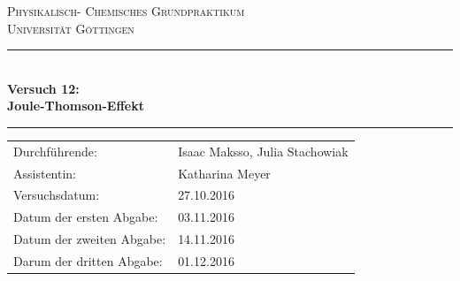 \documentclass[a4paper,12pt,oneside,onecolum,final,openany]{report}
\begin{document}
\begin{titlepage}
\centering
\textsc{\Large Physikalisch- Chemisches Grundpraktikum\\[1.5ex] Universität Göttingen}

\vspace*{0.5cm}

\rule{\textwidth}{1pt}\\[0.5cm]
{\huge \bfseries
  Versuch 12: \\[1.5ex]
  Joule-Thomson-Effekt}\\[0.5cm]
\rule{\textwidth}{1pt}

\vspace*{0.5cm}


\begin{Large}
\begin{tabular}{ll}
Durchführende: &  Isaac Maksso, Julia Stachowiak\\
Assistentin: & Katharina Meyer \\
 Versuchsdatum: & 27.10.2016\\
 Datum der ersten Abgabe: & 03.11.2016\\
 Datum der zweiten Abgabe: & 14.11.2016\\
 Darum der dritten Abgabe: & 01.12.2016
\end{tabular}
\end{Large}

\vspace*{0.5cm}



\end{titlepage}
\end{document}
